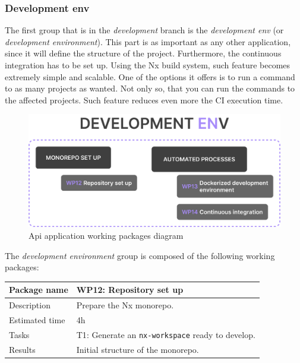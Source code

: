 \documentclass[a4paper, 12pt, oneside]{book}
\begin{document}
\subsubsection{Development env}
The first group that is in the \emph{development} branch is the \emph{development env} (or \emph{development environment}). This part is as important as any other application, since it will define the structure of the project. Furthermore, the continuous integration has to be set up. Using the Nx build system, such feature becomes extremely simple and scalable. One of the options it offers is to run a command to as many projects as wanted. Not only so, that you can run the commands to the affected projects. Such feature reduces even more the CI execution time.
\begin{figure}[H]
	\centering
	\includegraphics[width=\textwidth]{assets/working-packages/DevEnv.png}
	\caption{Api application working packages diagram}
\end{figure}
The \emph{development environment} group is composed of the following working packages:
\\[8pt]
\begin{tabularx}{\textwidth}{| l | X |}
	\hline
	\rowcolor{rowColor}
	{\semibf Package name}   & {\semibf WP12}: Repository set up                                 \\
	\hline
	{\semibf Description}    & Prepare the Nx monorepo.                                          \\
	\hline
	\rowcolor{rowColor}
	{\semibf Estimated time} & 4h                                                                \\
	\hline
	{\semibf Tasks}          & {\semibf T1}: Generate an \texttt{nx-workspace} ready to develop. \\
	\hline
	\rowcolor{rowColor}
	{\semibf Results}        & Initial structure of the monorepo.                                \\
	\hline
\end{tabularx}
\end{document}
